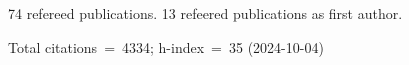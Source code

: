 74 refereed publications. 13 refeered publications as first author.

Total citations~=~4334; h-index~=~35 (2024-10-04)